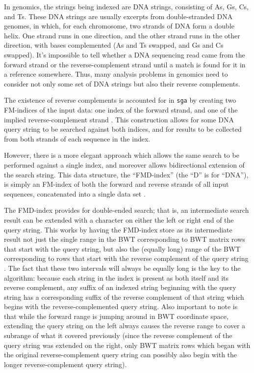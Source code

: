 \documentclass[11pt,proposal]{ucthesis}
\begin{document}
In genomics, the strings being indexed are DNA strings, consisting of As, Gs, Cs, and Ts. These DNA strings are usually excerpts from double-stranded DNA genomes, in which, for each chromosome, two strands of DNA form a double helix. One strand runs in one direction, and the other strand runs in the other direction, with bases complemented (As and Ts swapped, and Gs and Cs swapped). It's impossible to tell whether a DNA sequencing read came from the forward strand or the reverse-complement strand until a match is found for it in a reference somewhere. Thus, many analysis problems in genomics need to consider not only some set of DNA strings but also their reverse complements.

The existence of reverse complements is accounted for in \texttt{sga} by creating two FM-indices of the input data: one index of the forward strand, and one of the implied reverse-complement strand \cite{simpson2012efficient}. This construction allows for some DNA query string to be searched against both indices, and for results to be collected from both strands of each sequence in the index.

However, there is a more elegant approach which allows the same search to be performed against a single index, and moreover allows bidirectional extension of the search string. This data structure, the ``FMD-index'' (the ``D'' is for ``DNA''), is simply an FM-index of both the forward and reverse strands of all input sequences, concatenated into a single data set \cite{li2012exploring}.

The FMD-index provides for double-ended search; that is, an intermediate search result can be extended with a character on either the left or right end of the query string. This works by having the FMD-index store as its intermediate result not just the single range in the BWT corresponding to BWT matrix rows that start with the query string, but also the (equally long) range of the BWT corresponding to rows that start with the reverse complement of the query string \cite{li2012exploring}. The fact that these two intervals will always be equally long is the key to the algorithm: because each string in the index is present as both itself and its reverse complement, any suffix of an indexed string beginning with the query string has a corresponding suffix of the reverse complement of that string which begins with the reverse-complemented query string. Also important to note is that while the forward range is jumping around in BWT coordinate space, extending the query string on the left always causes the reverse range to cover a subrange of what it covered previously (since the reverse complement of the query string was extended on the right, only BWT matrix rows which began with the original reverse-complement query string can possibly also begin with the longer reverse-complement query string).
\end{document}

